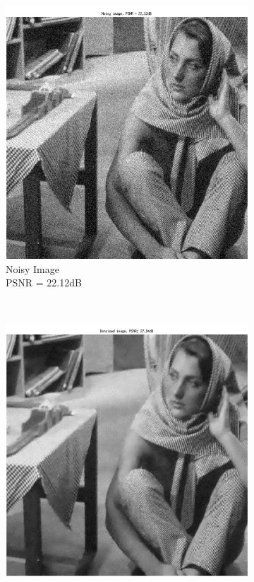 \documentclass{article} %
\begin{document}
\begin{figure}[H]
        \centering
        \begin{subfigure}[b]{0.5\textwidth}
                \includegraphics[width=\textwidth]{images/Noisy}
                \caption{Noisy Image\\PSNR = 22.12dB}
                \label{fig:NoisyIm}
        \end{subfigure}%
        ~ %
        \begin{subfigure}[b]{0.5\textwidth}
                \includegraphics[width=\textwidth]{images/Denoised_DALM}

\end{subfigure}
\end{figure}
\end{document}
